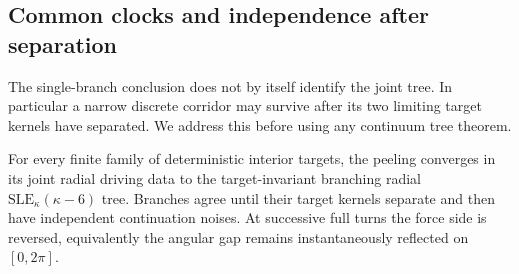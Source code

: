 \subsection{Common clocks and independence after separation}
\label{tree:joint}

The single-branch conclusion does not by itself identify the joint
tree.  In particular a narrow discrete corridor may survive after its
two limiting target kernels have separated.  We address this before
using any continuum tree theorem.

\begin{proposition}\label{tree:joint-law}
For every finite family of deterministic interior targets, the peeling
converges in its joint radial driving data to the target-invariant
branching radial $\mathrm{SLE}_\kappa(\kappa-6)$ tree.  Branches agree
until their target kernels separate and then have independent
continuation noises.  At successive full turns the force side is
reversed, equivalently the angular gap remains instantaneously
reflected on $[0,2\pi]$.
\end{proposition}

